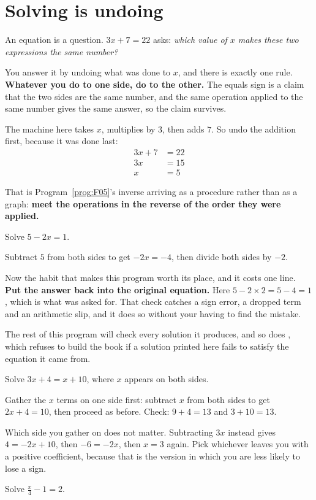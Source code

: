 \section{Solving is undoing}
\label{sec:F06-undoing}

\begin{fr}
An equation is a question. $3x + 7 = 22$ asks: \emph{which value of $x$ makes
these two expressions the same number?}

You answer it by undoing what was done to $x$, and there is exactly one rule.
\textbf{Whatever you do to one side, do to the other.} The equals sign is a
claim that the two sides are the same number, and the same operation applied
to the same number gives the same answer, so the claim survives.

The machine here takes $x$, multiplies by $3$, then adds $7$. So undo the
addition first, because it was done last:
\begin{align*}
3x + 7 &= 22 \\
3x &= 15 \\
x &= 5
\end{align*}

That is Program~\ref{prog:F05}'s inverse arriving as a procedure rather than
as a graph: \textbf{meet the operations in the reverse of the order they were
applied.}

Solve $5 - 2x = 1$.
\nextframe
\end{fr}

\begin{fr}
Subtract $5$ from both sides to get $-2x = -4$, then divide both sides by $-2$.

Now the habit that makes this program worth its place, and it costs one line.
\textbf{Put the answer back into the original equation.} Here
$5 - 2 \times 2 = 5 - 4 = 1$, which is what was asked for. That check catches a
sign error, a dropped term and an arithmetic slip, and it does so without your
having to find the mistake.

The rest of this program will check every solution it produces, and so does
, which refuses to build the book if a solution
printed here fails to satisfy the equation it came from.

Solve $3x + 4 = x + 10$, where $x$ appears on both sides.
\nextframe
\end{fr}

\begin{fr}
Gather the $x$ terms on one side first: subtract $x$ from both sides to get
$2x + 4 = 10$, then proceed as before. Check: $9 + 4 = 13$ and $3 + 10 = 13$.

Which side you gather on does not matter. Subtracting $3x$ instead gives
$4 = -2x + 10$, then $-6 = -2x$, then $x = 3$ again. Pick whichever leaves you
with a positive coefficient, because that is the version in which you are less
likely to lose a sign.

Solve $\frac{x}{4} - 1 = 2$.
\nextframe
\end{fr}

